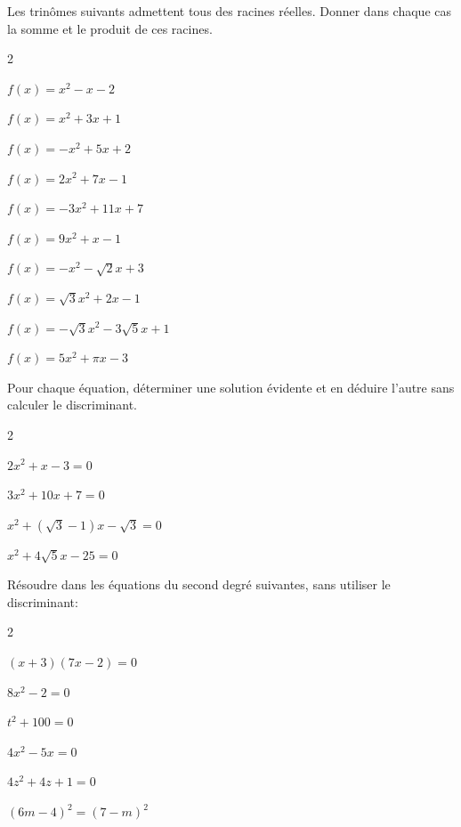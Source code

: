 \documentclass[11pt,a4paper]{article}  %
\begin{document}
Les trinômes suivants admettent tous des racines réelles. Donner dans chaque cas la somme et le produit de ces racines.
\begin{multicols}{2}
\begin{enumMet}
	\item $f(x)=x^2-x-2$
	\item $f(x)=x^2+3 x+1$
	\item $f(x)=-x^2+5 x+2$
	\item $f(x)=2 x^2+7 x-1$
	\item $f(x)=-3 x^2+11 x+7$
	\item $f(x)=9 x^2+x-1$
	\item $f(x)=-x^2-\sqrt{2} x+3$
	\item $f(x)=\sqrt{3} x^2+2 x-1$
	\item $f(x)=-\sqrt{3} x^2-3 \sqrt{5} x+1$
	\item $f(x)=5 x^2+\pi x-3$
\end{enumMet}
\end{multicols}


Pour chaque équation, déterminer une solution évidente et en déduire l'autre sans calculer le discriminant.
\begin{multicols}{2}
\begin{enumMet}
	\item $2 x^2+x-3=0$
	\item $3 x^2+10 x+7=0$
	\item $x^2+(\sqrt{3}-1) x-\sqrt{3}=0$
	\item $x^2+4 \sqrt{5} x-25=0$
\end{enumMet}
\end{multicols}

\exercice{}

Résoudre dans \R les équations du second degré suivantes, sans utiliser le discriminant:
\begin{multicols}{2}
\begin{enumMet}
	\item $(x+3)(7 x-2)=0$
	\item $8 x^2-2=0$
	\item $t^2+100=0$
	\item $4 x^2-5 x=0$
	\item $4 z^2+4 z+1=0$
	\item $(6 m-4)^2=(7-m)^2$
\end{enumMet}
\end{multicols}
\end{document}
